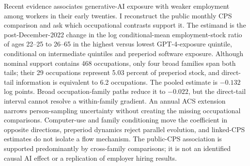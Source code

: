 Recent evidence associates generative-AI exposure with weaker employment among workers in their early twenties. I reconstruct the public monthly CPS comparison and ask which occupational contrasts support it. The estimand is the post-December-2022 change in the log conditional-mean employment-stock ratio of ages 22--25 to 26--65 in the highest versus lowest GPT-4-exposure quintile, conditional on intermediate quintiles and preperiod software exposure. Although nominal support contains 468 occupations, only four broad families span both tails; their 29 occupations represent 5.03 percent of preperiod stock, and direct-tail information is equivalent to 6.2 occupations. The pooled estimate is $-0.132$ log points. Broad occupation-family paths reduce it to $-0.022$, but the direct-tail interval cannot resolve a within-family gradient. An annual ACS extension narrows person-sampling uncertainty without creating the missing occupational comparisons. Computer-use and family conditioning move the coefficient in opposite directions, preperiod dynamics reject parallel evolution, and linked-CPS estimates do not isolate a flow mechanism. The public-CPS association is supported predominantly by cross-family comparisons; it is not an identified causal AI effect or a replication of employer hiring results.
